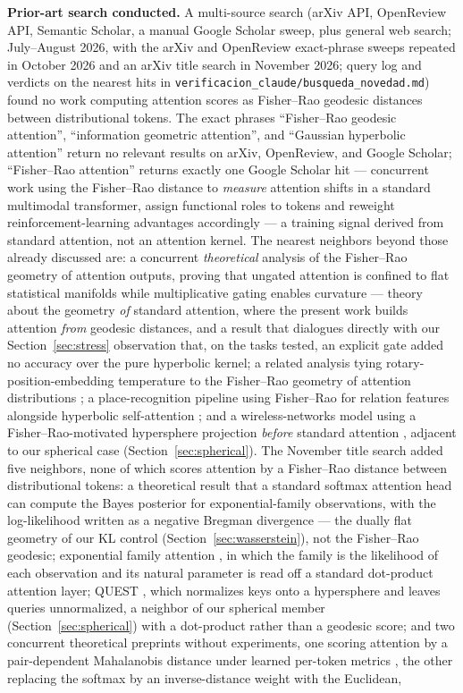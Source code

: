 \documentclass[11pt]{article}
\begin{document}
\textbf{Prior-art search conducted.} A multi-source search (arXiv API, OpenReview API, Semantic Scholar, a manual Google Scholar sweep, plus general web search; July--August 2026, with the arXiv and OpenReview exact-phrase sweeps repeated in October 2026 and an arXiv title search in November 2026; query log and verdicts on the nearest hits in \texttt{verificacion\_claude/}\allowbreak\texttt{busqueda\_novedad.md}) found no work computing attention scores as Fisher--Rao geodesic distances between distributional tokens. The exact phrases ``Fisher--Rao geodesic attention'', ``information geometric attention'', and ``Gaussian hyperbolic attention'' return no relevant results on arXiv, OpenReview, and Google Scholar; ``Fisher--Rao attention'' returns exactly one Google Scholar hit --- concurrent work using the Fisher--Rao distance to \emph{measure} attention shifts in a standard multimodal transformer, assign functional roles to tokens and reweight reinforcement-learning advantages accordingly \cite{lin2026dyco} --- a training signal derived from standard attention, not an attention kernel. The nearest neighbors beyond those already discussed are: a concurrent \emph{theoretical} analysis of the Fisher--Rao geometry of attention outputs, proving that ungated attention is confined to flat statistical manifolds while multiplicative gating enables curvature \cite{bathula2026gating} --- theory about the geometry \emph{of} standard attention, where the present work builds attention \emph{from} geodesic distances, and a result that dialogues directly with our Section~\ref{sec:stress} observation that, on the tasks tested, an explicit gate added no accuracy over the pure hyperbolic kernel; a related analysis tying rotary-position-embedding temperature to the Fisher--Rao geometry of attention distributions \cite{mtetwa2026rope}; a place-recognition pipeline using Fisher--Rao for relation features alongside hyperbolic self-attention \cite{shang2026riemannian}; and a wireless-networks model using a Fisher--Rao-motivated hypersphere projection \emph{before} standard attention \cite{jiu2026rieif}, adjacent to our spherical case (Section~\ref{sec:spherical}). The November title search added five neighbors, none of which scores attention by a Fisher--Rao distance between distributional tokens: a theoretical result that a standard softmax attention head can compute the Bayes posterior for exponential-family observations, with the log-likelihood written as a negative Bregman divergence \cite{rubacher2026attention} --- the dually flat geometry of our KL control (Section~\ref{sec:wasserstein}), not the Fisher--Rao geodesic; exponential family attention \cite{wibisono2025exponential}, in which the family is the likelihood of each observation and its natural parameter is read off a standard dot-product attention layer; QUEST \cite{govindarajan2026quest}, which normalizes keys onto a hypersphere and leaves queries unnormalized, a neighbor of our spherical member (Section~\ref{sec:spherical}) with a dot-product rather than a geodesic score; and two concurrent theoretical preprints without experiments, one scoring attention by a pair-dependent Mahalanobis distance under learned per-token metrics \cite{song2026riemannian}, the other replacing the softmax by an inverse-distance weight with the Euclidean, 
\end{document}
